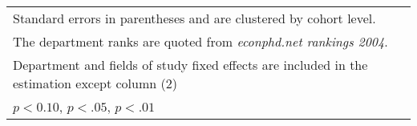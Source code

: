 \begin{table}[htbp]
\begin{adjustbox}{max width=0.54\textwidth}
\begin{tabular}{l*{4}{c}}
\hline\hline
\multicolumn{5}{l}{\footnotesize Standard errors in parentheses and are clustered by cohort level.}\\
\multicolumn{5}{l}{\footnotesize The department ranks are quoted from \textit{econphd.net rankings 2004}.}\\
\multicolumn{5}{l}{\footnotesize Department and fields of study fixed effects are included in the estimation except column (2)}\\
\multicolumn{5}{l}{\footnotesize \sym{*} \(p<0.10\), \sym{**} \(p<.05\), \sym{***} \(p<.01\)}\\
\end{tabular}%
	\end{adjustbox}
\end{table}
